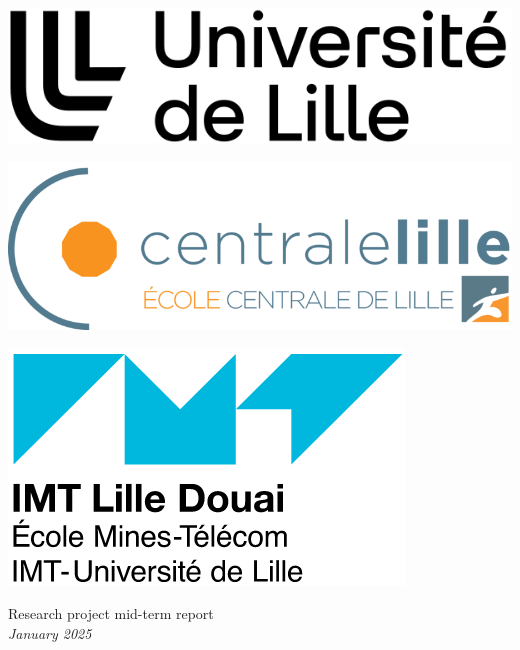\begin{titlepage}
\centering
\begin{minipage}{.25\linewidth}
\includegraphics[width=\linewidth]{../images-figures/ulille.png}
\end{minipage}
\hfill
\begin{minipage}{.25\linewidth}
\centering
\includegraphics[width=\linewidth]{../images-figures/Centrale-Lille-Ecole.png}
\end{minipage}
\hfill
\begin{minipage}{.25\linewidth}
\includegraphics[width=\linewidth]{../images-figures/imt.png}
\end{minipage}

\vfill


{\large Research project mid-term report \\ \textit{January 2025} \vspace{1\baselineskip}}


\end{titlepage}
